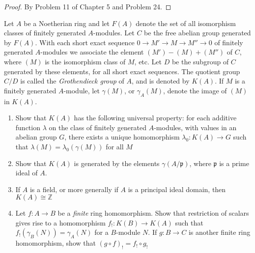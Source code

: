 \documentclass{solution}
\begin{document}
\begin{proof}
    By Problem 11 of Chapter 5 and Problem 24.
\end{proof}

\begin{problem}
    Let $A$ be a Noetherian ring and let $F(A)$ denote the set of all isomorphism classes of finitely generated $A$-modules. Let $C$ be the free abelian group generated by $F(A)$. With each short exact sequence $0 \rightarrow M' \rightarrow M \rightarrow M'' \rightarrow 0$ of finitely generated $A$-modules we associate the element $(M') - (M) + (M'')$ of $C$, where $(M)$ is the isomorphism class of $M$, etc. Let $D$ be the subgroup of $C$ generated by these elements, for all short exact sequences. The quotient group $C / D$ is called the \textit{Grothendieck group} of $A$, and is denoted by $K(A)$. If $M$ is a finitely generated $A$-module, let $\gamma(M)$, or $\gamma_A(M)$, denote the image of $(M)$ in $K(A)$.
    \begin{enumerate}
        \item Show that $K(A)$ has the following universal property: for each additive function $\lambda$ on the class of finitely generated $A$-modules, with values in an abelian group $G$, there exists a unique homomorphism $\lambda_0: K(A) \rightarrow G$ such that $\lambda(M) = \lambda_0(\gamma(M))$ for all $M$
        \item Show that $K(A)$ is generated by the elements $\gamma(A / \mathfrak{p})$, where $\mathfrak{p}$ is a prime ideal of $A$.
        \item If $A$ is a field, or more generally if $A$ is a principal ideal domain, then $K(A) \cong \mathbb{Z}$
        \item Let $f: A \rightarrow B$ be a \textit{finite} ring homomorphism. Show that restriction of scalars gives rise to a homomorphism $f_{!}: K(B) \rightarrow K(A)$ such that $f_{!}(\gamma_B(N)) = \gamma_A(N)$ for a $B$-module $N$. If $g: B \rightarrow C$ is another finite ring homomorphism, show that $(g \circ f)_{!} = f_{!} \circ g_{!}$
    \end{enumerate}
\end{problem}
\end{document}
